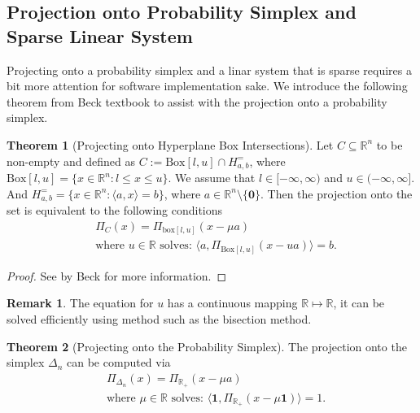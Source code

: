 \documentclass[11pt]{article}
\theoremstyle{definition}
\newtheorem{theorem}{Theorem}       %
\newtheorem{remark}{Remark}[subsection]
{
    \newtheorem{assumption}{Assumption}
}
\numberwithin{equation}{subsection}
\begin{document}
    \subsection{Projection onto Probability Simplex and Sparse Linear System}
        Projecting onto a probability simplex and a linar system that is sparse requires a bit more attention for software implementation sake. 
        We introduce the following theorem from Beck textbook to assist with the projection onto a probability simplex. 
        \begin{theorem}[Projecting onto Hyperplane Box Intersections]\label{thm:proj_master}
            Let $C\subseteq \mathbb R^n$ to be non-empty and defined as $C := \text{Box}[l, u] \cap H_{a, b}^=$, 
            where $\text{Box}[l, u] = \{x\in \mathbb R^n : l \le x \le u\}$. We assume that $l\in [-\infty, \infty)$ and $u\in (-\infty, \infty]$. 
            And $H_{a, b}^= = \{x\in \mathbb R^n: \langle a, x\rangle = b\}$, where $a \in \mathbb R^n \setminus \{\mathbf 0\}$. 
            Then the projection onto the set is equivalent to the following conditions 
            \begin{align*}
                &\Pi_C(x) = \Pi_{\text{box}[l, u]}(x - \mu a)
                \\
                &\text{where }u \in \mathbb R \text{ solves: } \langle a, \Pi_{\text{Box}[l, u]}(x - u a)\rangle = b. 
            \end{align*}
        \end{theorem}
        \begin{proof}
            See \cite[thereom 6.27]{beck_first-order_nodate} by Beck for more information. 
        \end{proof}
        \begin{remark}
            The equation for $u$ has a continuous mapping $\mathbb R \mapsto \mathbb R$, it can be solved efficiently using method such as the bisection method. 
        \end{remark}
        \begin{theorem}[Projecting onto the Probability Simplex]\label{thm:proj_prob_simplex}
            The projection onto the simplex $\Delta_n$ can be computed via 
            \begin{align*}
                & \Pi_{\Delta_n}(x) = \Pi_{\mathbb R_+}(x - \mu a)
                \\
                & \text{where }\mu \in \mathbb R \text{ solves: } \langle \mathbf 1, \Pi_{\mathbb R_+}(x - \mu \mathbf 1)\rangle = 1.     
            \end{align*}
        \end{theorem}
\end{document}
